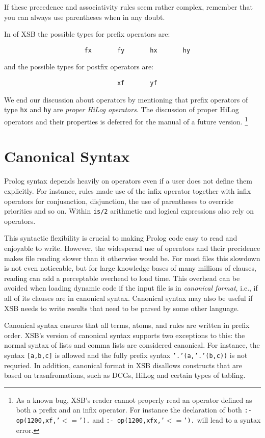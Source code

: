 If these precedence and associativity rules seem rather complex, remember
that you can always use parentheses when in any doubt.

In \version{} of XSB the possible types for prefix operators are:
\begin{verbatim}
                      fx       fy       hx       hy
\end{verbatim}
and the possible types for postfix operators are:
\begin{verbatim}
                               xf       yf
\end{verbatim}

We end our discussion about operators by mentioning that prefix
operators of type {\tt hx} and {\tt hy} are {\em proper HiLog
  operators}.  The discussion of proper HiLog operators and their
properties is deferred for the manual of a future version.
\footnote{As a known bug, XSB's reader cannot properly read an
  operator defined as both a prefix and an infix operator.  For
  instance the declaration of both {\tt :- op(1200,xf,'$<=$').} and 
{\tt :- op(1200,xfx,'$<=$').} will lead to a syntax error.}

\section{Canonical Syntax} \label{sec:canonical}
%
Prolog syntax depends heavily on operators even if a user does not
define them explicitly.  For instance, rules made use of the infix
\mif{} operator together with infix operators for conjusnction,
disjunction, the use of parentheses to override priorities and so on.
Within {\tt is/2} arithmetic and logical expressions also rely on
operators.  

This syntactic flexibility is crucial to making Prolog code easy to
read and enjoyable to write.  However, the widesperad use of operators
and their precidence makes file reading slower than it otherwise would
be.  For most files this slowdown is not even noticeable, but for
large knowledge bases of many millions of clauses, reading can add a
perceptable overhead to load time.  This overhead can be avoided when
loading dynamic code if the input file is in {\em canonical format},
i.e., if all of its clauses are in canonical syntax.  Canonical syntax
may also be useful if XSB needs to write results that need to be
parsed by some other language.

Canonical syntax ensures that all terms, atoms, and rules are written
in prefix order.  XSB's version of canonical syntax supports two
exceptions to this: the normal syntax of lists and comma lists are
considered canonical.  For instance, the syntax {\tt [a,b,c]} is
allowed and the fully prefix syntax {\tt '.'(a,'.'(b,c))} is not
requried.  In addition, canonical format in XSB disallows constructs
that are based on trasnfromations, such as DCGs, HiLog and certain
types of tabling.

